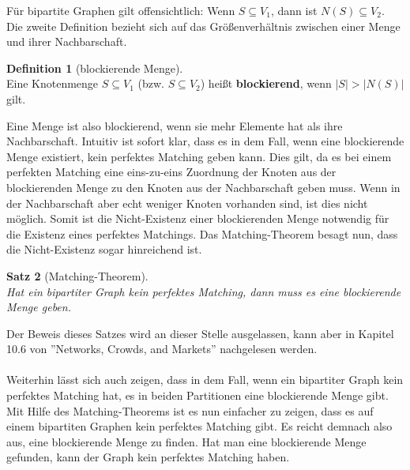 \documentclass[a4paper]{scrreprt}
\theoremstyle{plain} %
\newtheorem{theorem}{Satz}[chapter]
\theoremstyle{definition} %
\newtheorem{definition}[theorem]{Definition}
\begin{document}
\noindent
Für bipartite Graphen gilt offensichtlich: Wenn $S \subseteq V_1$, dann ist $N(S) \subseteq V_2$. 
Die zweite Definition bezieht sich auf das Größenverhältnis zwischen einer Menge und ihrer Nachbarschaft.

\begin{definition}[blockierende Menge] ~\\
Eine Knotenmenge $S \subseteq V_1$ (bzw. $S \subseteq V_2$) heißt \textbf{blockierend}, wenn $|S| > |N(S)|$ gilt.
\end{definition}

\noindent
Eine Menge ist also blockierend, wenn sie mehr Elemente hat als ihre Nachbarschaft. Intuitiv ist sofort klar,
dass es in dem Fall, wenn eine blockierende Menge existiert, kein perfektes Matching geben kann.
Dies gilt,  da es bei 
einem perfekten Matching eine eins-zu-eins Zuordnung der Knoten aus der blockierenden Menge zu den Knoten 
aus der Nachbarschaft geben muss. Wenn in der Nachbarschaft aber echt weniger Knoten vorhanden sind, 
ist dies nicht möglich. Somit ist die Nicht-Existenz einer blockierenden Menge notwendig
für die Existenz eines perfektes Matchings. Das Matching-Theorem besagt nun, dass die Nicht-Existenz
sogar hinreichend ist.



\begin{theorem}[Matching-Theorem]
\ \\
Hat ein bipartiter Graph kein perfektes Matching, dann muss es eine blockierende Menge geben.
\label{matchingtheorem}
\end{theorem}

\noindent
Der Beweis dieses Satzes wird an dieser Stelle ausgelassen, kann aber in Kapitel 10.6 von ''Networks, Crowds, and Markets'' \cite{alles} nachgelesen werden.
\\
\\
Weiterhin lässt sich auch zeigen, dass in dem Fall, wenn ein bipartiter Graph kein
perfektes Matching hat, es in beiden Partitionen eine blockierende Menge gibt.
Mit Hilfe des Matching-Theorems ist es nun einfacher zu zeigen, dass es auf einem bipartiten Graphen
kein perfektes Matching gibt. Es reicht demnach also aus, eine blockierende Menge zu finden. Hat man
eine blockierende Menge gefunden, kann der Graph kein perfektes Matching haben.
\end{document}
